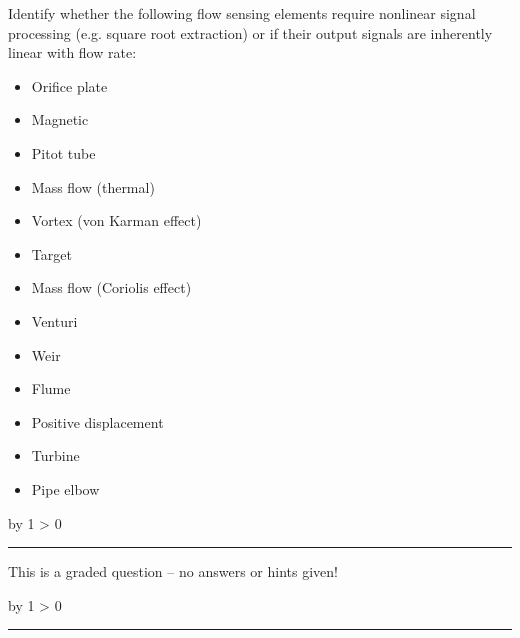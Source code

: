\documentclass[12pt,a4paper]{article}
\def\svar{
           \advance\answnum by 1
           \ifnum \answnum > 0
                \hrule
                \vskip 3pt
                \leftline{Svar \the\answnum}
                \vskip 3pt \fi}
\def\notes{
           \advance\explnum by 1
           \ifnum \explnum > 0
                \hrule
                \vskip 3pt
                \leftline{Notes \the\explnum}
                \vskip 3pt \fi}
\begin{document}
Identify whether the following flow sensing elements require nonlinear signal processing (e.g. square root extraction) or if their output signals are inherently linear with flow rate:

\begin{itemize}
\item{} Orifice plate
\vskip 5pt
\item{} Magnetic
\vskip 5pt
\item{} Pitot tube
\vskip 5pt
\item{} Mass flow (thermal)
\vskip 5pt
\item{} Vortex (von Karman effect)
\vskip 5pt
\item{} Target
\vskip 5pt
\item{} Mass flow (Coriolis effect)
\vskip 5pt
\item{} Venturi
\vskip 5pt
\item{} Weir
\vskip 5pt
\item{} Flume
\vskip 5pt
\item{} Positive displacement
\vskip 5pt
\item{} Turbine
\vskip 5pt
\item{} Pipe elbow
\end{itemize}

\vfil

\eject
\vskip 10pt \filbreak 





\svar{} 

This is a graded question -- no answers or hints given!

\vskip 10pt \filbreak 





\notes{} 
\end{document}
